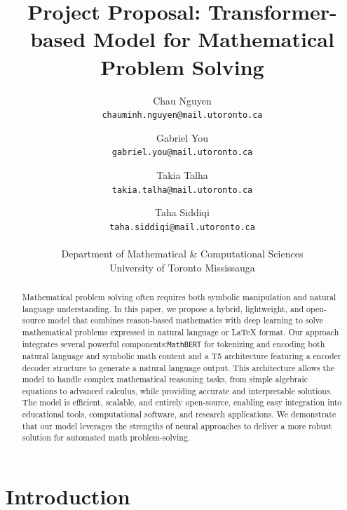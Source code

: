 \documentclass{article}
\title{Project Proposal: Transformer-based Model for Mathematical Problem Solving}
\author{%
    Chau Nguyen \\
    \texttt{chauminh.nguyen@mail.utoronto.ca} \\
    \and
    Gabriel You \\
    \texttt{gabriel.you@mail.utoronto.ca} \\
    \and
    Takia Talha \\
    \texttt{takia.talha@mail.utoronto.ca} \\
    \and
    Taha Siddiqi \\
    \texttt{taha.siddiqi@mail.utoronto.ca} \\
    \\
    Department of Mathematical \& Computational Sciences \\
    University of Toronto Mississauga
}
\begin{document}
\maketitle


\begin{abstract}

  Mathematical problem solving often requires both symbolic manipulation and natural language understanding. In this paper, we propose a hybrid, lightweight, and open-source model that combines reason-based mathematics with deep learning to solve mathematical problems expressed in natural language or LaTeX format. Our approach integrates several powerful components:\texttt{MathBERT} for tokenizing and encoding both natural language and symbolic math content and a T5 architecture featuring a encoder decoder structure to generate a natural language output. This architecture allows the model to handle complex mathematical reasoning tasks, from simple algebraic equations to advanced calculus, while providing accurate and interpretable solutions. The model is efficient, scalable, and entirely open-source, enabling easy integration into educational tools, computational software, and research applications. We demonstrate that our  model leverages the strengths of neural approaches to deliver a more robust solution for automated math problem-solving.
  \end{abstract}
\section{Introduction}
\end{document}
